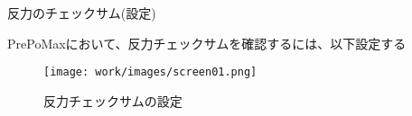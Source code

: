 \begin{frame}{反力のチェックサム(設定)}
 
  PrePoMaxにおいて、反力チェックサムを確認するには、以下設定する \\
  \begin{figure}[htbp]
    \begin{center}
      \texttt{[image: work/images/screen01.png]}
      \caption{反力チェックサムの設定}
    \end{center}
  \end{figure}
\end{frame}
